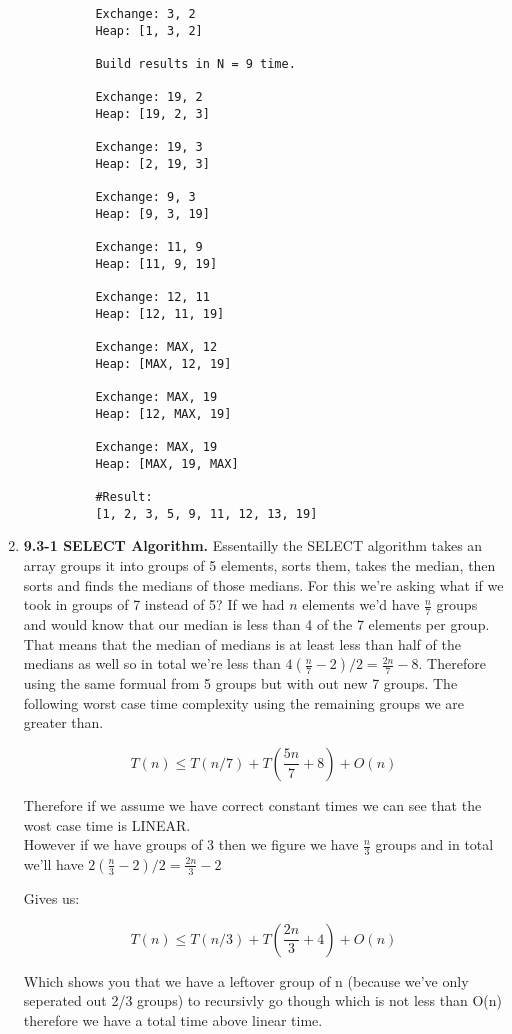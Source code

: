 \documentclass{article}
\begin{document}
\begin{enumerate}
\begin{lstlisting}
          Exchange: 3, 2
          Heap: [1, 3, 2]
          
          Build results in N = 9 time.
          
          Exchange: 19, 2
          Heap: [19, 2, 3]
          
          Exchange: 19, 3
          Heap: [2, 19, 3]
          
          Exchange: 9, 3
          Heap: [9, 3, 19]
          
          Exchange: 11, 9
          Heap: [11, 9, 19]
          
          Exchange: 12, 11
          Heap: [12, 11, 19]
          
          Exchange: MAX, 12
          Heap: [MAX, 12, 19]
          
          Exchange: MAX, 19
          Heap: [12, MAX, 19]
          
          Exchange: MAX, 19
          Heap: [MAX, 19, MAX]
          
          #Result:
          [1, 2, 3, 5, 9, 11, 12, 13, 19]
        \end{lstlisting}

        \item \textbf{9.3-1 SELECT Algorithm.}
        Essentailly the SELECT algorithm takes an array groups it into groups of 5 elements, sorts them, takes the median, then sorts and finds the medians of those medians.
        For this we're asking what if we took in groups of 7 instead of 5? 
        If we had $n$ elements we'd have $\frac{n}{7}$ groups and would know that our median is less than 4 of the 7 elements per group. 
        That means that the median of medians is at least less than half of the medians as well so in total we're less than $4(\frac{n}{7} - 2) / 2 = \frac{2n}{7} - 8$.
        Therefore using the same formual from 5 groups but with out new 7 groups. The following worst case time complexity using the remaining groups we are greater than.

        \[T(n) \leq T(n/7) + T(\frac{5n}{7} + 8) + O(n)\]

        Therefore if we assume we have correct constant times we can see that the wost case time is LINEAR.\\

        However if we have groups of 3 then we figure we have $\frac{n}{3}$ groups and in total we'll have $2(\frac{n}{3} - 2) / 2 = \frac{2n}{3} - 2$

        Gives us:

        \[T(n) \leq T(n/3) + T(\frac{2n}{3} + 4) + O(n)\]

        Which shows you that we have a leftover group of n (because we've only seperated out 2/3 groups) to recursivly go though which is not less than O(n) therefore we have a total time above linear time.
        

  \end{enumerate}
\end{document}
